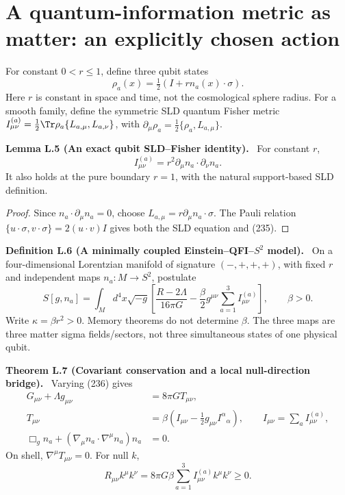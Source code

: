 \documentclass[11pt,a4paper,oneside]{book}
\newcommand{\statement}[3]{\par\medskip\noindent\textbf{#1 #2 (#3).}\ }
\begin{document}
\section{A quantum-information metric as matter: an explicitly chosen action}
For constant $0<r\le1$, define three qubit states
\begin{equation}\rho_a(x)=\tfrac12(I+rn_a(x)\cdot\sigma).\tag{234}\end{equation}
Here $r$ is constant in space and time, not the cosmological sphere radius. For a smooth family, define the symmetric SLD quantum Fisher metric $I^{(a)}_{\mu\nu}=\tfrac12\Tr\rho_a\{L_{a,\mu},L_{a,\nu}\}$, with $\partial_\mu\rho_a=\tfrac12\{\rho_a,L_{a,\mu}\}$.
\statement{Lemma}{L.5}{An exact qubit SLD--Fisher identity}
For constant $r$,
\begin{equation}I^{(a)}_{\mu\nu}=r^2\partial_\mu n_a\cdot\partial_\nu n_a.\tag{235}\end{equation}
It also holds at the pure boundary $r=1$, with the natural support-based SLD definition.
\begin{proof}
Since $n_a\cdot\partial_\mu n_a=0$, choose $L_{a,\mu}=r\partial_\mu n_a\cdot\sigma$. The Pauli relation $\{u\cdot\sigma,v\cdot\sigma\}=2(u\cdot v)I$ gives both the SLD equation and (235).
\end{proof}
\statement{Definition}{L.6}{A minimally coupled Einstein--QFI--$S^2$ model}
On a four-dimensional Lorentzian manifold of signature $(-,+,+,+)$, with fixed $r$ and independent maps $n_a:M\to S^2$, postulate
\begin{equation}S[g,n_a]=\int_Md^4x\sqrt{-g}\left[\frac{R-2\Lambda}{16\pi G}-\frac\beta2g^{\mu\nu}\sum_{a=1}^3I^{(a)}_{\mu\nu}\right],\qquad\beta>0.\tag{236}\end{equation}
Write $\kappa=\beta r^2>0$. Memory theorems do not determine $\beta$. The three maps are three matter sigma fields/sectors, not three simultaneous states of one physical qubit.
\statement{Theorem}{L.7}{Covariant conservation and a local null-direction bridge}
Varying (236) gives
\begin{align}G_{\mu\nu}+\Lambda g_{\mu\nu}&=8\pi GT_{\mu\nu},\tag{237}\\
T_{\mu\nu}&=\beta(I_{\mu\nu}-\tfrac12g_{\mu\nu}I^\alpha{}_{\alpha}),\qquad I_{\mu\nu}=\sum_aI^{(a)}_{\mu\nu},\tag{238}\\
\Box_gn_a+(\nabla_\mu n_a\cdot\nabla^\mu n_a)n_a&=0.\tag{239}\end{align}
On shell, $\nabla^\mu T_{\mu\nu}=0$. For null $k$,
\begin{equation}R_{\mu\nu}k^\mu k^\nu=8\pi G\beta\sum_{a=1}^3I^{(a)}_{\mu\nu}k^\mu k^\nu\ge0.\tag{240}\end{equation}
\end{document}
